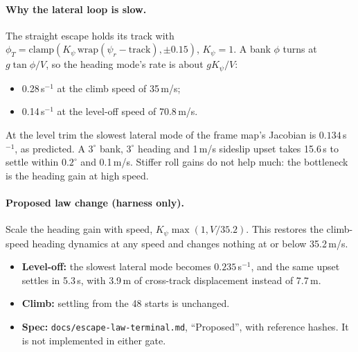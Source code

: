 \documentclass[11pt]{article}
\begin{document}
\paragraph{Why the lateral loop is slow.} The straight escape holds its track with $\phi_T = \mathrm{clamp}(K_\psi\,\mathrm{wrap}(\psi_r - \text{track}), \pm0.15)$, $K_\psi = 1$. A bank $\phi$ turns at $g\tan\phi/V$, so the heading mode's rate is about $g K_\psi / V$:
\begin{itemize}
\item 0.28\,s$^{-1}$ at the climb speed of 35\,m/s;
\item 0.14\,s$^{-1}$ at the level-off speed of 70.8\,m/s.
\end{itemize}
At the level trim the slowest lateral mode of the frame map's Jacobian is $0.134$\,s$^{-1}$, as predicted. A $3^\circ$ bank, $3^\circ$ heading and 1\,m/s sideslip upset takes 15.6\,s to settle within $0.2^\circ$ and 0.1\,m/s. Stiffer roll gains do not help much: the bottleneck is the heading gain at high speed.

\paragraph{Proposed law change (harness only).} Scale the heading gain with speed, $K_\psi \max(1, V/35.2)$. This restores the climb-speed heading dynamics at any speed and changes nothing at or below 35.2\,m/s.
\begin{itemize}
\item \textbf{Level-off:} the slowest lateral mode becomes $0.235$\,s$^{-1}$, and the same upset settles in 5.3\,s, with 3.9\,m of cross-track displacement instead of 7.7\,m.
\item \textbf{Climb:} settling from the 48 starts is unchanged.
\item \textbf{Spec:} \texttt{docs/escape-law-terminal.md}, ``Proposed'', with reference hashes. It is not implemented in either gate.
\end{itemize}
\end{document}
